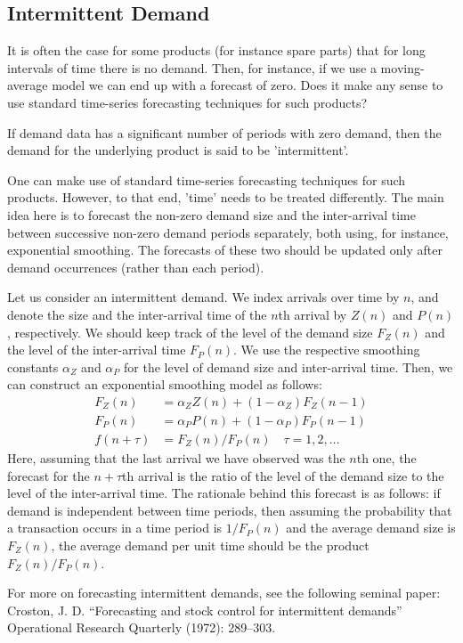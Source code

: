   
\subsection{Intermittent Demand}

\begin{exercise}
It is often the case for some products (for instance spare parts) that for long intervals of time there is no demand. Then, for instance, if we use a moving-average model we can end up with a forecast of zero. Does it make any sense to use standard time-series forecasting techniques for such products?


  \begin{solution}
  If demand data has a significant number of periods with zero demand, then the demand for the underlying product is said to be 'intermittent'. 
  
  One can make use of standard time-series forecasting techniques for such products. However, to that end, 'time' needs to be treated differently. The main idea here is to forecast the non-zero demand size and the inter-arrival time between successive non-zero demand periods separately, both using, for instance, exponential smoothing. The forecasts of these two should be updated only after demand occurrences (rather than each period). 
  
  Let us consider an intermittent demand. We index arrivals over time by $n$, and denote the size and the inter-arrival time of the $n$th arrival by $Z(n)$ and $P(n)$, respectively. We should keep track of the level of the demand size $F_Z(n)$ and the level of the inter-arrival time $F_P(n)$. We use the respective smoothing constants $\alpha_Z$ and $\alpha_P$ for the level of demand size and inter-arrival time. Then, we can construct an exponential smoothing model as follows:
\begin{align*}
F_Z(n) & = \alpha_Z Z(n) + (1-\alpha_Z) F_Z(n-1) \\
F_P(n) & = \alpha_P P(n) + (1-\alpha_P) F_P(n-1) \\
f(n+\tau) & = F_Z(n)/F_P(n) \quad \tau = 1,2,\ldots
\end{align*}   
   Here, assuming that the last arrival we have observed was the $n$th one, the forecast for the $n+\tau$th arrival is the ratio of the level of the demand size to the level of the inter-arrival time. The rationale behind this forecast is as follows: if demand is independent between time periods, then assuming the probability that a transaction occurs in a time period is $1/F_P(n)$ and the average demand size is $F_Z(n)$, the average demand per unit time should be the product $F_Z(n)/F_P(n)$.
   
For more on forecasting intermittent demands, see the following seminal paper: Croston, J. D. ``Forecasting and stock control for intermittent demands'' Operational Research Quarterly (1972): 289--303.   
  \end{solution}
\end{exercise}

